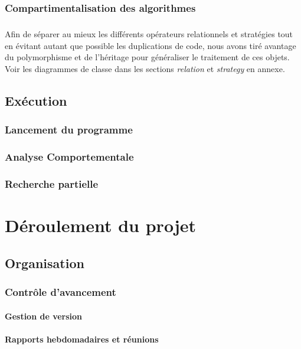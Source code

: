 \documentclass[a4paper,10pt]{report}
\begin{document}
\subsection{Compartimentalisation des algorithmes}
\paragraph{}
  Afin de séparer au mieux les différents opérateurs relationnels et stratégies
tout en évitant autant que possible les duplications de code, nous avons tiré
avantage du polymorphisme et de l'héritage pour généraliser le traitement de ces
objets. Voir les diagrammes de classe dans les sections \textit{relation} et
\textit{strategy} en annexe.


\section{Exécution}
\subsection{Lancement du programme}
\subsection{Analyse Comportementale}

\subsection{Recherche partielle}


\chapter{Déroulement du projet}
\section{Organisation}
\subsection{Contrôle d'avancement}

\subsubsection{Gestion de version}

\subsubsection{Rapports hebdomadaires et réunions}
\end{document}
